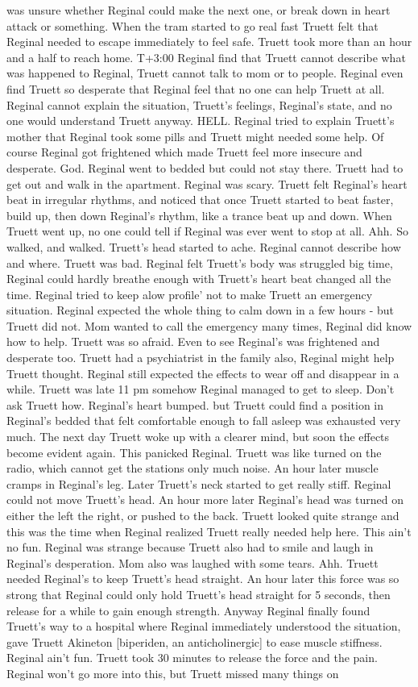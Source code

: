 \documentclass[12pt]{book}
\begin{document}
was unsure whether Reginal could make the next one, or break down in heart attack or something. When the tram started to go real fast Truett felt that Reginal needed to escape immediately to feel safe. Truett took more than an hour and a half to reach home. T+3:00 Reginal find that Truett cannot describe what was happened to Reginal, Truett cannot talk to mom or to people. Reginal even find Truett so desperate that Reginal feel that no one can help Truett at all. Reginal cannot explain the situation, Truett's feelings, Reginal's state, and no one would understand Truett anyway. HELL. Reginal tried to explain Truett's mother that Reginal took some pills and Truett might needed some help. Of course Reginal got frightened which made Truett feel more insecure and desperate. God. Reginal went to bedded but could not stay there. Truett had to get out and walk in the apartment. Reginal was scary. Truett felt Reginal's heart beat in irregular rhythms, and noticed that once Truett started to beat faster, build up, then down Reginal's rhythm, like a trance beat up and down. When Truett went up, no one could tell if Reginal was ever went to stop at all. Ahh. So walked, and walked. Truett's head started to ache. Reginal cannot describe how and where. Truett was bad. Reginal felt Truett's body was struggled big time, Reginal could hardly breathe enough with Truett's heart beat changed all the time. Reginal tried to keep alow profile' not to make Truett an emergency situation. Reginal expected the whole thing to calm down in a few hours - but Truett did not. Mom wanted to call the emergency many times, Reginal did know how to help. Truett was so afraid. Even to see Reginal's was frightened and desperate too. Truett had a psychiatrist in the family also, Reginal might help Truett thought. Reginal still expected the effects to wear off and disappear in a while. Truett was late 11 pm somehow Reginal managed to get to sleep. Don't ask Truett how. Reginal's heart bumped. but Truett could find a position in Reginal's bedded that felt comfortable enough to fall asleep was exhausted very much. The next day Truett woke up with a clearer mind, but soon the effects become evident again. This panicked Reginal. Truett was like turned on the radio, which cannot get the stations only much noise. An hour later muscle cramps in Reginal's leg. Later Truett's neck started to get really stiff. Reginal could not move Truett's head. An hour more later Reginal's head was turned on either the left the right, or pushed to the back. Truett looked quite strange and this was the time when Reginal realized Truett really needed help here. This ain't no fun. Reginal was strange because Truett also had to smile and laugh in Reginal's desperation. Mom also was laughed with some tears. Ahh. Truett needed Reginal's to keep Truett's head straight. An hour later this force was so strong that Reginal could only hold Truett's head straight for 5 seconds, then release for a while to gain enough strength. Anyway Reginal finally found Truett's way to a hospital where Reginal immediately understood the situation, gave Truett Akineton [biperiden, an anticholinergic] to ease muscle stiffness. Reginal ain't fun. Truett took 30 minutes to release the force and the pain. Reginal won't go more into this, but Truett missed many things on 
\end{document}
